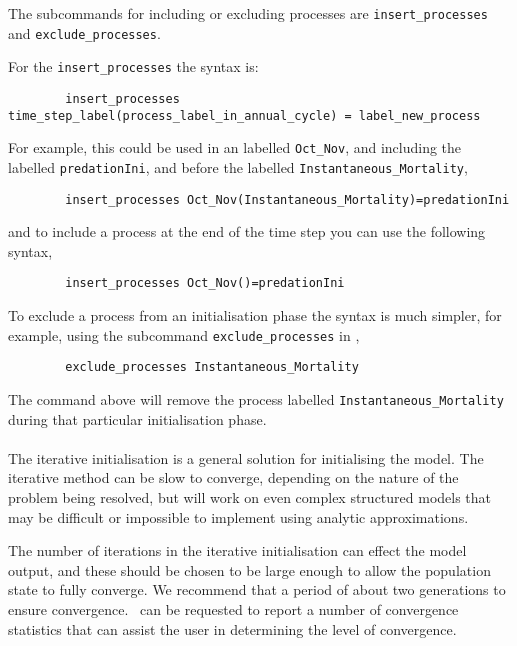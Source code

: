 The subcommands for including or excluding processes are \texttt{insert\_processes} and \texttt{exclude\_processes}. 

For the \texttt{insert\_processes} the syntax is:
{\small{\begin{verbatim}
		insert_processes time_step_label(process_label_in_annual_cycle) = label_new_process
\end{verbatim}}}
		
For example, this could be used in an  labelled \texttt{Oct\_Nov}, and including the  labelled \texttt{predationIni}, and before the  labelled \texttt{Instantaneous\_Mortality}, 

{\small{\begin{verbatim}
		insert_processes Oct_Nov(Instantaneous_Mortality)=predationIni
\end{verbatim}}}

and to  include a process at the end of the time step you can use the following syntax,

{\small{\begin{verbatim}
		insert_processes Oct_Nov()=predationIni
		\end{verbatim}}}
	
To exclude a process from an initialisation phase the syntax is much simpler, for example, using the subcommand \texttt{exclude\_processes} in ,

{\small{\begin{verbatim}
		exclude_processes Instantaneous_Mortality
		\end{verbatim}}}

The command above will remove the process labelled \texttt{Instantaneous\_Mortality} during that particular initialisation phase.

\paragraph{}

The iterative initialisation is a general solution for initialising the model. The iterative method can be slow to converge, depending on the nature of the problem being resolved, but will work on even complex structured models that may be difficult or impossible to implement using analytic approximations. 

The number of iterations in the iterative initialisation can effect the model output, and these should be chosen to be large enough to allow the population state to fully converge. We recommend that a period of about two generations to ensure convergence. \CNAME\ can be requested to report a number of convergence statistics that can assist the user in determining the level of convergence.

